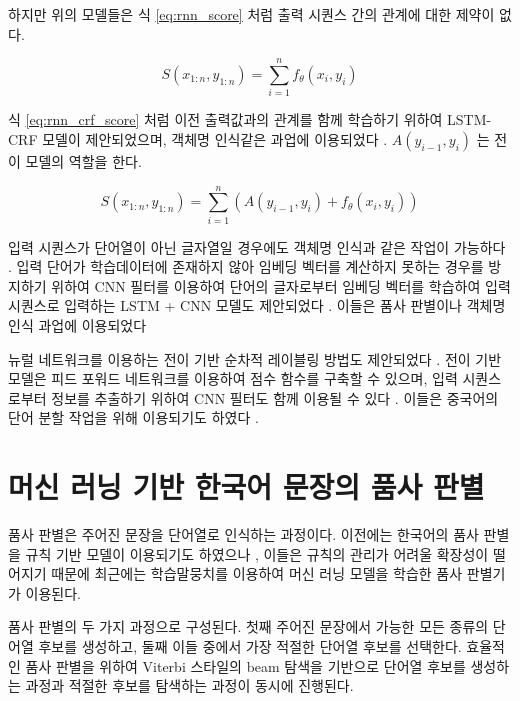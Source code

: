\documentclass[11pt]{article}
\begin{document}
하지만 위의 모델들은 식 \ref{eq:rnn_score} 처럼 출력 시퀀스 간의 관계에 대한 제약이 없다.

\begin{equation}
  \label{eq:rnn_score}
  S(x_{1:n}, y_{1:n}) = \sum_{i=1}^n f_\theta(x_i, y_i)
\end{equation}

식 \ref{eq:rnn_crf_score} 처럼 이전 출력값과의 관계를 함께 학습하기 위하여 LSTM-CRF 모델이 제안되었으며, 객체명 인식같은 과업에 이용되었다 \citep{lample2016neural}.
$A(y_{i-1}, y_i)$ 는 전이 모델의 역할을 한다.

\begin{equation}
  \label{eq:rnn_crf_score}
  S(x_{1:n}, y_{1:n}) = \sum_{i=1}^n \left( A(y_{i-1}, y_i) + f_\theta(x_i, y_i) \right)
\end{equation}

입력 시퀀스가 단어열이 아닌 글자열일 경우에도 객체명 인식과 같은 작업이 가능하다 \citep{gridach2017character}.
입력 단어가 학습데이터에 존재하지 않아 임베딩 벡터를 계산하지 못하는 경우를 방지하기 위하여 CNN 필터를 이용하여 단어의 글자로부터 임베딩 벡터를 학습하여 입력 시퀀스로 입력하는 LSTM + CNN 모델도 제안되었다 \citep{chiu2016named}.
이들은 품사 판별이나 객체명 인식 과업에 이용되었다 \citep{ma2016end, santos2014learning}

뉴럴 네트워크를 이용하는 전이 기반 순차적 레이블링 방법도 제안되었다 \citep{zheng2013deep, collobert2011natural, alberti2015improved}.
전이 기반 모델은 피드 포워드 네트워크를 이용하여 점수 함수를 구축할 수 있으며, 입력 시퀀스로부터 정보를 추출하기 위하여 CNN 필터도 함께 이용될 수 있다 \citep{collobert2011natural}.
이들은 중국어의 단어 분할 작업을 위해 이용되기도 하였다 \citep{zhang2016transition, cai2017fast, ballesteros2015improved}.

\section{머신 러닝 기반 한국어 문장의 품사 판별}

품사 판별은 주어진 문장을 단어열로 인식하는 과정이다.
이전에는 한국어의 품사 판별을 규칙 기반 모델이 이용되기도 하였으나 \cite{yang2000part, choi1993bidirectional}, 이들은 규칙의 관리가 어려울 확장성이 떨어지기 때문에 최근에는 학습말뭉치를 이용하여 머신 러닝 모델을 학습한 품사 판별기가 이용된다.

품사 판별의 두 가지 과정으로 구성된다.
첫째 주어진 문장에서 가능한 모든 종류의 단어열 후보를 생성하고, 둘째 이들 중에서 가장 적절한 단어열 후보를 선택한다.
효율적인 품사 판별을 위하여 Viterbi 스타일의 beam 탐색을 기반으로 단어열 후보를 생성하는 과정과 적절한 후보를 탐색하는 과정이 동시에 진행된다.
\end{document}
